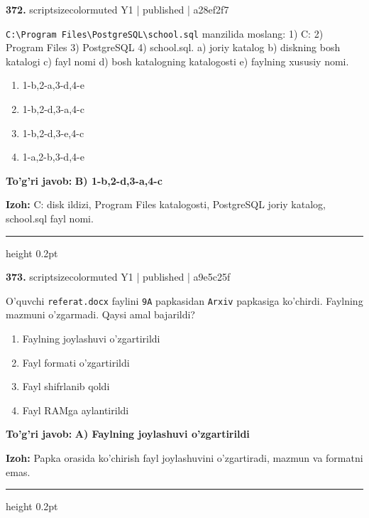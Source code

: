 \documentclass[10pt,a4paper]{article}
\begin{document}
{\bfseries\sffamily\color{ink} 372.} {scriptsizecolor{muted} Y1 | published | a28ef2f7}
\par
\texttt{C:\textbackslash{}Program Files\textbackslash{}PostgreSQL\textbackslash{}school.sql} manzilida moslang: 1) C: 2) Program Files 3) PostgreSQL 4) school.sql. a) joriy katalog b) diskning bosh katalogi c) fayl nomi d) bosh katalogning katalogosti e) faylning xususiy nomi.
\begin{enumerate}[label=\Alph*),leftmargin=9mm]
\item 1-b,2-a,3-d,4-e
\item 1-b,2-d,3-a,4-c
\item 1-b,2-d,3-e,4-c
\item 1-a,2-b,3-d,4-e
\end{enumerate}
\begin{tcolorbox}[enhanced,breakable,colback=teal!4,colframe=teal!60!black,boxrule=0.45pt,arc=1.2mm,left=2.7mm,right=2.7mm,top=1.8mm,bottom=1.8mm,before skip=2mm,after skip=2mm]
{\bfseries\sffamily\color{teal}To'g'ri javob:} \textbf{B) 1-b,2-d,3-a,4-c}
\par\smallskip
{\bfseries Izoh:} C: disk ildizi, Program Files katalogosti, PostgreSQL joriy katalog, school.sql fayl nomi.
\end{tcolorbox}
\vspace{2mm}\hrule height 0.2pt\vspace{3mm}

{\bfseries\sffamily\color{ink} 373.} {scriptsizecolor{muted} Y1 | published | a9e5c25f}
\par
O'quvchi \texttt{referat.docx} faylini \texttt{9A} papkasidan \texttt{Arxiv} papkasiga ko'chirdi. Faylning mazmuni o'zgarmadi. Qaysi amal bajarildi?
\begin{enumerate}[label=\Alph*),leftmargin=9mm]
\item Faylning joylashuvi o'zgartirildi
\item Fayl formati o'zgartirildi
\item Fayl shifrlanib qoldi
\item Fayl RAMga aylantirildi
\end{enumerate}
\begin{tcolorbox}[enhanced,breakable,colback=teal!4,colframe=teal!60!black,boxrule=0.45pt,arc=1.2mm,left=2.7mm,right=2.7mm,top=1.8mm,bottom=1.8mm,before skip=2mm,after skip=2mm]
{\bfseries\sffamily\color{teal}To'g'ri javob:} \textbf{A) Faylning joylashuvi o'zgartirildi}
\par\smallskip
{\bfseries Izoh:} Papka orasida ko'chirish fayl joylashuvini o'zgartiradi, mazmun va formatni emas.
\end{tcolorbox}
\vspace{2mm}\hrule height 0.2pt\vspace{3mm}
\end{document}
